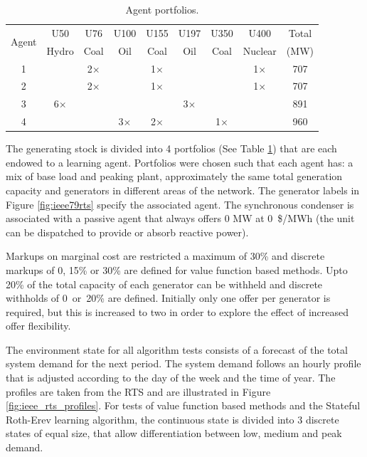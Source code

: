 \begin{table}
\centering
\begin{tabular}{c|c|c|c|c|c|c|c|c}
\hline
\multirow{2}{*}{Agent} &U50 &U76 &U100 &U155 &U197 &U350 &U400 &Total \\
 &Hydro &Coal &Oil &Coal &Oil &Coal &Nuclear &(MW) \\
\hline\hline
1 & &2$\times$ & &1$\times$ & & &1$\times$ &707 \\
2 & &2$\times$ & &1$\times$ & & &1$\times$ &707 \\
3 &6$\times$ & & & &3$\times$ & & &891 \\
4 & & &3$\times$ &2$\times$ & &1$\times$ & &960 \\
\hline
\end{tabular}
\caption{Agent portfolios.}
\label{tbl:agent_portfolios}
\end{table}

The generating stock is divided into 4 portfolios (See Table
\ref{tbl:agent_portfolios}) that are each endowed to a learning agent.
Portfolios were chosen such that each agent has: a mix of base load and peaking
plant, approximately the same total generation capacity and generators in
different areas of the network.  The generator labels in Figure
\ref{fig:ieee79rts} specify the associated agent.  The synchronous condenser is
associated with a passive agent that always offers 0 MW at 0~\$/MWh (the
unit can be dispatched to provide or absorb reactive power).


Markups on marginal cost are restricted a maximum of 30\% and discrete markups
of 0, 15\% or 30\% are defined for value function based methods.  Upto 20\% of
the total capacity of each generator can be withheld and discrete withholds of
0~or~20\% are defined.  Initially only one offer per generator is required, but
this is increased to two in order to explore the effect of increased offer
flexibility.

The environment state for all algorithm tests consists of a forecast of the
total system demand for the next period.  The system demand follows an hourly
profile that is adjusted according to the day of the week and the time of year.
The profiles are taken from the RTS and are illustrated in Figure
\ref{fig:ieee_rts_profiles}.  For tests of value function based methods and the
Stateful Roth-Erev learning algorithm, the continuous state is divided into 3
discrete states of equal size, that allow differentiation between low, medium and peak
demand.

